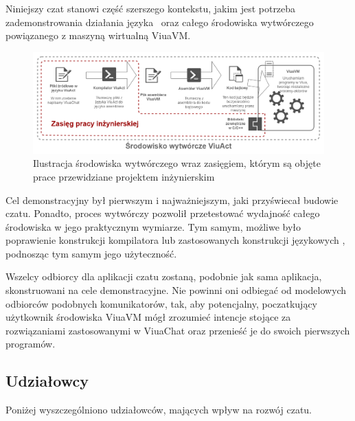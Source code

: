 Niniejszy czat stanowi część szerszego kontekstu, jakim jest potrzeba zademonstrowania działania języka
\ViuAct\ oraz całego środowiska wytwórczego powiązanego z maszyną wirtualną ViuaVM.

\begin{figure}[h]
	\centering
	\includegraphics[width=\textwidth]{chat/fig/viuavm-env}
	\caption{Ilustracja środowiska wytwórczego wraz zasięgiem, którym są objęte prace przewidziane projektem inżynierskim}
\end{figure}

Cel demonstracyjny był pierwszym i najważniejszym, jaki przyświecał budowie
czatu. Ponadto, proces wytwórczy pozwolił przetestować wydajność całego
środowiska w jego praktycznym wymiarze. Tym samym, możliwe było poprawienie
konstrukcji kompilatora lub zastosowanych konstrukcji językowych \ViuAct,
podnosząc tym samym jego użyteczność.

Wszelcy odbiorcy dla aplikacji czatu zostaną, podobnie jak sama aplikacja,
skonstruowani na cele demonstracyjne. Nie powinni oni odbiegać od modelowych
odbiorców podobnych komunikatorów, tak, aby potencjalny, poczatkujący
użytkownik środowiska ViuaVM mógł zrozumieć intencje stojące za rozwiązaniami
zastosowanymi w ViuaChat oraz przenieść je do swoich pierwszych programów.

\subsection{Udziałowcy}

Poniżej wyszczególniono udziałowców, mających wpływ na rozwój czatu.

